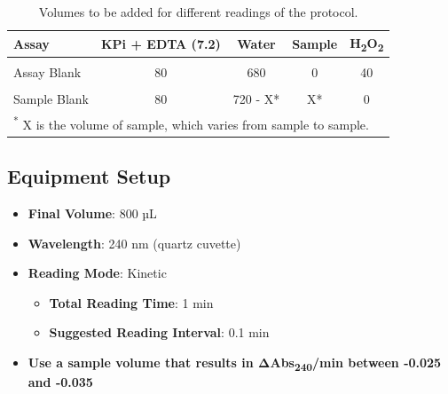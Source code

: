 \documentclass[
  9pt,
  american,
  a5paper,
  extrafontsizes,onecolumn,openright
  ]{memoir}
\providecommand{\tightlist}{%
  \setlength{\itemsep}{0pt}\setlength{\parskip}{0pt}}
\begin{document}
\normalsize

\scriptsize

\begin{table}[!h]
\centering
\caption{\label{tab:cat-tab-vol}Volumes to be added for different readings of the protocol.}
\centering
\begin{tabular}[t]{lcccc}
\toprule
\textbf{Assay} & \textbf{KPi + EDTA (7.2)} & \textbf{Water} & \textbf{Sample} & \textbf{H\textsubscript{2}O\textsubscript{2}}\\
\midrule
\cellcolor{gray!10}{Zero} & \cellcolor{gray!10}{80} & \cellcolor{gray!10}{720} & \cellcolor{gray!10}{0} & \cellcolor{gray!10}{0}\\
Assay Blank & 80 & 680 & 0 & 40\\
\cellcolor{gray!10}{Sample Assay} & \cellcolor{gray!10}{80} & \cellcolor{gray!10}{680 - X*} & \cellcolor{gray!10}{X*} & \cellcolor{gray!10}{40}\\
Sample Blank & 80 & 720 - X* & X* & 0\\
\bottomrule
\multicolumn{5}{l}{\textsuperscript{*} X is the volume of sample, which varies from sample to sample.}\\
\end{tabular}
\end{table}

\normalsize



\subsection*{Equipment Setup}\label{equipment-setup}

\begin{itemize}
\tightlist
\item
  \textbf{Final Volume}: 800 µL
\item
  \textbf{Wavelength}: 240 nm (quartz cuvette)
\item
  \textbf{Reading Mode}: Kinetic

  \begin{itemize}
  \tightlist
  \item
    \textbf{Total Reading Time}: 1 min
  \item
    \textbf{Suggested Reading Interval}: 0.1 min
  \end{itemize}
\item
  \textbf{Use a sample volume that results in ΔAbs\textsubscript{240}/min between -0.025 and -0.035}
\end{itemize}
\end{document}
